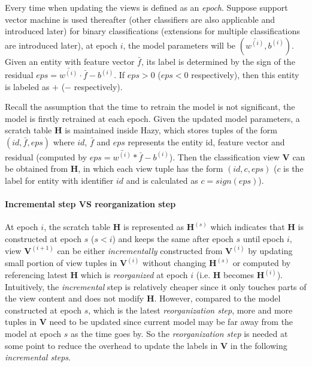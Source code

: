 Every time when updating the views is defined as an {\em epoch}. Suppose support vector machine is used thereafter (other classifiers are also applicable and introduced later) for binary classifications (extensions for multiple classifications are introduced later), at epoch $i$, the model parameters will be $(\bar{w^{(i)}}, b^{(i)})$. Given an entity with feature vector $\bar{f}$, its label is determined by the sign of the residual $eps = \bar{w^{(i)}}\cdot\bar{f}-b^{(i)}$. If $eps > 0$ ($eps < 0$ respectively), then this entity is labeled as $+$ ($-$ respectively).

Recall the assumption that the time to retrain the model is not significant, the model is firstly retrained at each epoch. Given the updated model parameters, a scratch table $\textbf{H}$ is maintained inside Hazy, which stores tuples of the form $(id, \bar{f}, eps)$ where $id$, $\bar{f}$ and $eps$ represents the entity id, feature vector and residual (computed by $eps = \bar{w^{(i)}}*\bar{f}-b^{(i)}$). Then the classification view $\textbf{V}$ can be obtained from $\textbf{H}$, in which each view tuple has the form $(id, c, eps)$ ($c$ is the label for entity with identifier $id$ and is calculated as $c=sign(eps)$). 

\paragraph{Incremental step VS reorganization step} At epoch $i$, the scratch table $\textbf{H}$ is represented as $\textbf{H}^{(s)}$ which indicates that $\textbf{H}$ is constructed at epoch $s$ ($s < i$) and keeps the same after epoch $s$ until epoch $i$, view $\textbf{V}^{(i+1)}$ can be either {\em incrementally} constructed from $\textbf{V}^{(i)}$ by updating small portion of view tuples in $\textbf{V}^{(i)}$ without changing $\textbf{H}^{(s)}$ or computed by referencing latest $\textbf{H}$ which is {\em reorganized} at epoch $i$ (i.e. $\textbf{H}$ becomes $\textbf{H}^{(i)}$). Intuitively, the {\em incremental} step is relatively cheaper since it only touches parts of the view content and does not modify $\textbf{H}$. However, compared to the model constructed at epoch $s$, which is the latest {\em reorganization step}, more and more tuples in $\textbf{V}$ need to be updated since current model may be far away from the model at epoch $s$ as the time goes by. So the {\em reorganization step} is needed at some point to reduce the overhead to update the labels in $\textbf{V}$ in the following {\em incremental steps}.

